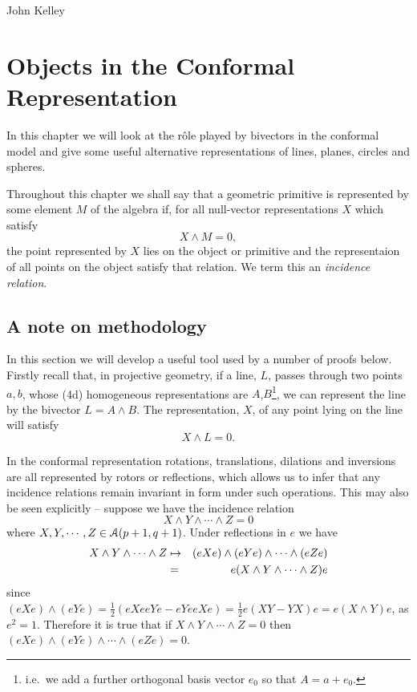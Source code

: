 \begin{savequote}
%
{John Kelley}%
\end{savequote}
\chapter{Objects in the Conformal Representation}

In this chapter we will look
at the r\^ole played by bivectors in the conformal model and give some useful
alternative representations of lines, planes, circles and spheres.

Throughout this chapter we shall say that a geometric primitive is
represented by some element $M$ of the algebra if, for all
null-vector representations $X$ which satisfy
\[
X \wedge M = 0,
\]
the point represented by $X$ lies on the object or primitive and the representaion of all
points on the object satisfy that relation. We term this an \emph{incidence
relation}.

\section{A note on methodology}
 
In this section we will develop a useful tool used by a number of proofs below.
Firstly recall that, in projective geometry, if a line, $L$, 
passes through two points $a,b$, whose (4d) homogeneous representations are 
$A$,$B$\footnote{i.e.\ we add a further orthogonal basis vector $e_0$ so that
$A = a + e_0$.}, we can represent the line by the bivector $L=A\wedge B$. The 
representation, $X$, of any point lying on the line will satisfy
%
\[ X\wedge L = 0.  \]

In the conformal representation rotations, translations, dilations and inversions
are all represented by rotors or reflections, which allows us to infer that any
incidence relations remain invariant in form under such operations. This may
also be seen explicitly -- suppose we have the incidence relation
%
\[ X \wedge Y \wedge \cdots  \wedge Z = 0 \]
%
where $X,Y,\cdots,Z \in {\mathcal{A}}(p+1,q+1)$. Under
reflections in $e$ we have
%
\begin{eqnarray}
   X \wedge Y \wedge \cdots  \wedge Z & \mapsto & (eXe) \wedge (eYe) \wedge \cdots
\wedge (eZe) \nonumber \\
   & = & e( X \wedge Y \wedge \cdots  \wedge Z)e \nonumber
\end{eqnarray}
%
since $(eXe)\wedge (eYe) = \frac{1}{2}(eXeeYe - eYeeXe) = \frac{1}{2}e(XY-YX)e 
= e(X\wedge Y)e$, as $e^2=1$. Therefore it is true that if $X\wedge Y\wedge \cdots
\wedge Z=0$ then $(eXe)\wedge (eYe)\wedge \cdots \wedge (eZe)=0$.

